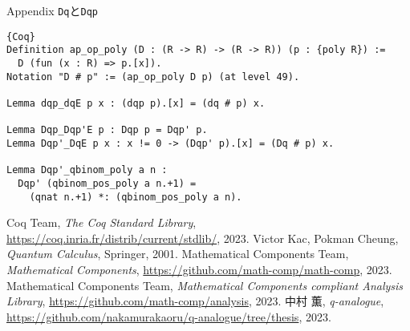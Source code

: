 \documentclass[dvipdfmx,cjk]{beamer}
\theoremstyle{mystyle}
\newcommand{\0}{\textbf{0}}
\begin{document}
\begin{frame}[fragile]{Appendix {\tt Dq}と{\tt Dqp}}
	\begin{lstlisting}{Coq}
Definition ap_op_poly (D : (R -> R) -> (R -> R)) (p : {poly R}) :=
  D (fun (x : R) => p.[x]).
Notation "D # p" := (ap_op_poly D p) (at level 49).

Lemma dqp_dqE p x : (dqp p).[x] = (dq # p) x. 

Lemma Dqp_Dqp'E p : Dqp p = Dqp' p.
Lemma Dqp'_DqE p x : x != 0 -> (Dqp' p).[x] = (Dq # p) x.

Lemma Dqp'_qbinom_poly a n :
  Dqp' (qbinom_pos_poly a n.+1) =
    (qnat n.+1) *: (qbinom_pos_poly a n).\end{lstlisting}
\end{frame}
\begin{thebibliography}{9}
	 Coq Team, {\it The Coq Standard Library}, 
		\url{https://coq.inria.fr/distrib/current/stdlib/}, 2023.
	 Victor Kac, Pokman Cheung, {\it{Quantum Calculus}}, Springer, 2001.
	 Mathematical Components Team, {\it Mathematical Components}, 		
		\url{https://github.com/math-comp/math-comp}, 2023.
	 Mathematical Components Team, 
		{\it Mathematical Components compliant Analysis Library}, 
			\url{https://github.com/math-comp/analysis}, 2023.
	 中村 薫, {\it q-analogue}, 
		\url{https://github.com/nakamurakaoru/q-analogue/tree/thesis}, 2023.
\end{thebibliography}
\end{document}
